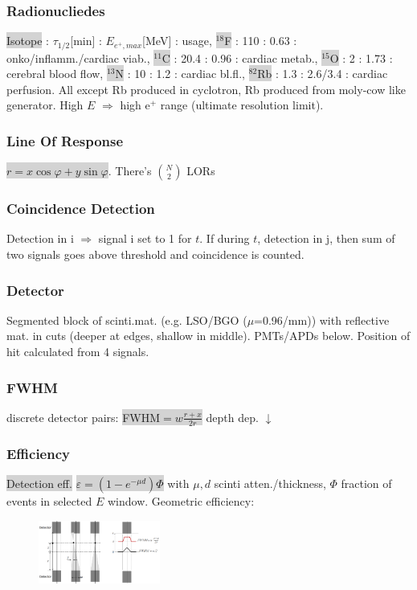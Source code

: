 \documentclass[9pt]{article}
\newcommand{\grey}[1]{\setlength{\fboxsep}{0pt}\colorbox{lightgrey}{#1}}
\begin{document}
\begin{multicols}{2}
\subsubsection{Radionucliedes} \grey{Isotope} : $\tau_{1/2}$[min] : $E_{e^+,max}$[MeV] : usage, \grey{${}^{18}$F} : 110 : 0.63 : onko/inflamm./cardiac viab., \grey{${}^{11}$C} : 20.4 : 0.96 : cardiac metab., \grey{${}^{15}$O} : 2 : 1.73 : cerebral blood flow, \grey{${}^{13}$N} : 10 : 1.2 : cardiac bl.fl., \grey{${}^{82}$Rb} : 1.3 : 2.6/3.4 : cardiac perfusion. All except Rb produced in cyclotron, Rb produced from moly-cow like generator. High $E$ $\Rightarrow$ high e${}^+$ range (ultimate resolution limit).

\subsubsection{Line Of Response}
\grey{$r=x\cos\varphi + y\sin\varphi$}. There's ${N \choose 2}$ LORs
\subsubsection{Coincidence Detection} Detection in i $\Rightarrow$ signal i set to 1 for $t$. If during $t$, detection in j, then sum of two signals goes above threshold and coincidence is counted.

\subsubsection{Detector}
Segmented block of scinti.mat. (e.g. LSO/BGO ($\mu$=0.96/mm)) with reflective mat. in cuts (deeper at edges, shallow in middle). PMTs/APDs below. Position of hit calculated from 4 signals.

\subsubsection{FWHM} discrete detector pairs: \grey{FWHM$=w\frac{r+x}{2r}$} depth dep. $\downarrow$

\subsubsection{Efficiency} 
\grey{Detection eff.} \grey{$\varepsilon = (1-e^{-\mu d})\Phi$} with $\mu,d$ scinti atten./thickness, $\Phi$ fraction of events in selected $E$ window.
Geometric efficiency: 
\begin{figure}
	\vspace{-4mm}
	\includegraphics[width=4cm,]{petfwhm.png}
\end{figure}


\end{multicols}
\end{document}
